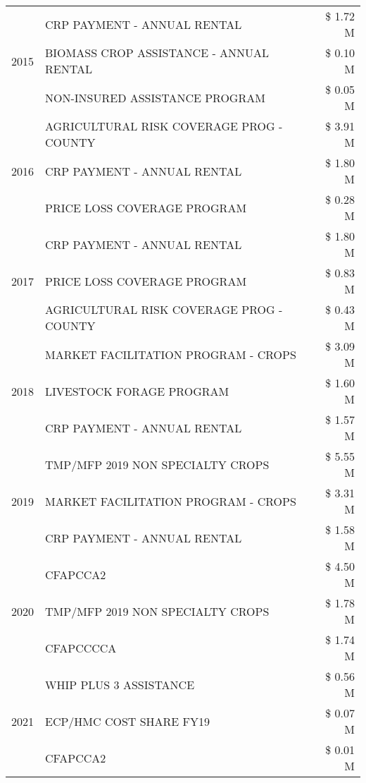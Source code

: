 \begin{tabular}{llr}
\multirow[t]{3}{*}{2015} & CRP PAYMENT - ANNUAL RENTAL & \$ 1.72 M \\
 & BIOMASS CROP ASSISTANCE - ANNUAL RENTAL & \$ 0.10 M \\
 & NON-INSURED ASSISTANCE PROGRAM & \$ 0.05 M \\
\cline{1-3}
\multirow[t]{3}{*}{2016} & AGRICULTURAL RISK COVERAGE PROG - COUNTY & \$ 3.91 M \\
 & CRP PAYMENT - ANNUAL RENTAL & \$ 1.80 M \\
 & PRICE LOSS COVERAGE PROGRAM & \$ 0.28 M \\
\cline{1-3}
\multirow[t]{3}{*}{2017} & CRP PAYMENT - ANNUAL RENTAL & \$ 1.80 M \\
 & PRICE LOSS COVERAGE PROGRAM & \$ 0.83 M \\
 & AGRICULTURAL RISK COVERAGE PROG - COUNTY & \$ 0.43 M \\
\cline{1-3}
\multirow[t]{3}{*}{2018} & MARKET FACILITATION PROGRAM - CROPS & \$ 3.09 M \\
 & LIVESTOCK FORAGE PROGRAM & \$ 1.60 M \\
 & CRP PAYMENT - ANNUAL RENTAL & \$ 1.57 M \\
\cline{1-3}
\multirow[t]{3}{*}{2019} & TMP/MFP 2019 NON SPECIALTY CROPS & \$ 5.55 M \\
 & MARKET FACILITATION PROGRAM - CROPS & \$ 3.31 M \\
 & CRP PAYMENT - ANNUAL RENTAL & \$ 1.58 M \\
\cline{1-3}
\multirow[t]{3}{*}{2020} & CFAPCCA2 & \$ 4.50 M \\
 & TMP/MFP 2019 NON SPECIALTY CROPS & \$ 1.78 M \\
 & CFAPCCCCA & \$ 1.74 M \\
\cline{1-3}
\multirow[t]{3}{*}{2021} & WHIP PLUS 3 ASSISTANCE & \$ 0.56 M \\
 & ECP/HMC COST SHARE FY19 & \$ 0.07 M \\
 & CFAPCCA2 & \$ 0.01 M \\
\cline{1-3}
\bottomrule
\end{tabular}
